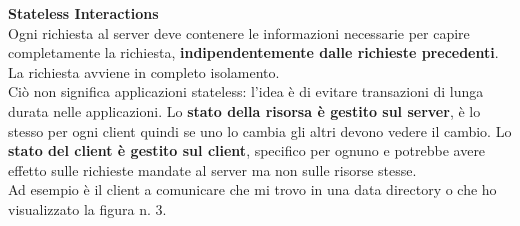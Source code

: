 \documentclass[10pt]{article}
\begin{document}
\begin{list}{}{}
	\item \textbf{Stateless Interactions}\\
	Ogni richiesta al server deve contenere le informazioni necessarie per capire completamente la richiesta, \textbf{indipendentemente dalle richieste precedenti}. La richiesta avviene in completo isolamento.\\
	Ciò non significa applicazioni stateless: l'idea è di evitare transazioni di lunga durata nelle applicazioni. Lo \textbf{stato della risorsa è gestito sul server}, è lo stesso per ogni client quindi se uno lo cambia gli altri devono vedere il cambio. Lo \textbf{stato del client è gestito sul client}, specifico per ognuno e potrebbe avere effetto sulle richieste mandate al server ma non sulle risorse stesse.\\
	Ad esempio è il client a comunicare che mi trovo in una data directory o che ho visualizzato la figura n. 3.
\end{list}
\end{document}
